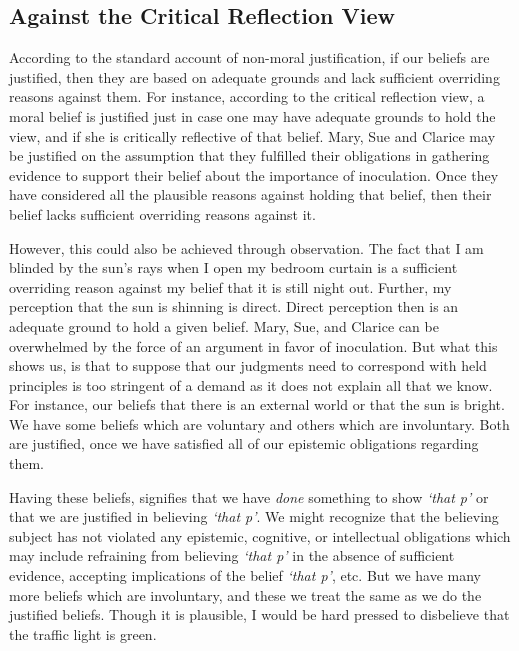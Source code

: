 \documentclass[phdthesis,12pt,final]{wuthesis}
\theoremstyle{definition}
\theoremstyle{definition}
\theoremstyle{definition}
\theoremstyle{definition}
\theoremstyle{remark}
\begin{document}
\subsection*{Against the Critical Reflection View}\label{against-the-critical-reflection-view-1}

According to the standard account of non-moral justification, if our beliefs are justified, then they are based on adequate grounds and lack sufficient overriding reasons against them. For instance, according to the critical reflection view, a moral belief is justified just in case one may have adequate grounds to hold the view, and if she is critically reflective of that belief. Mary, Sue and Clarice may be justified on the assumption that they fulfilled their obligations in gathering evidence to support their belief about the importance of inoculation. Once they have considered all the plausible reasons against holding that belief, then their belief lacks sufficient overriding reasons against it.

However, this could also be achieved through observation. The fact that I am blinded by the sun's rays when I open my bedroom curtain is a sufficient overriding reason against my belief that it is still night out. Further, my perception that the sun is shinning is direct. Direct perception then is an adequate ground to hold a given belief. Mary, Sue, and Clarice can be overwhelmed by the force of an argument in favor of inoculation. But what this shows us, is that to suppose that our judgments need to correspond with held principles is too stringent of a demand as it does not explain all that we know. For instance, our beliefs that there is an external world or that the sun is bright. We have some beliefs which are voluntary and others which are involuntary. Both are justified, once we have satisfied all of our epistemic obligations regarding them.

\begin{Shaded}
\begin{Highlighting}[]

\end{Highlighting}
\end{Shaded}

Having these beliefs, signifies that we have \emph{done} something to show \emph{`that p'} or that we are justified in believing \emph{`that p'}. We might recognize that the believing subject has not violated any epistemic, cognitive, or intellectual obligations which may include refraining from believing \emph{`that p'} in the absence of sufficient evidence, accepting implications of the belief \emph{`that p'}, etc. But we have many more beliefs which are involuntary, and these we treat the same as we do the justified beliefs. Though it is plausible, I would be hard pressed to disbelieve that the traffic light is green.
\end{document}
